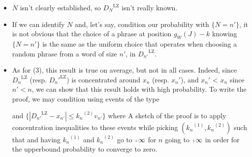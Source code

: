 \begin{itemize}
    \item $N$ isn't clearly established, so 
          ${D_N}^{\text{LZ}}$ isn't really known.

    \item If we can identify $N$ and, let's say,
          condition our probability with $\{ N = n' \}$, 
          it is not obvious
          that the choice of a phrase at position ${g_W(J)-k}$
          knowing $\{ N = n' \}$
          is the same as the uniform choice that operates
          when choosing a random phrase from a word of size
          $n'$, in ${D_{n'}}^{\text{LZ}}$.

    \item As for (3), this result is true on average, but 
          not in all cases. Indeed, since ${D_n}^{\text{LZ}}$
          (resp. ${D_n'}^{\text{LZ}}$) is concentrated
          around $x_n$ (resp. $x_n'$), and $x_n'$ < $x_n$
          since $n' < n$, we can show 
          that this result holds with high probability.
          To write the proof, we may condition using
          events of the type


          \leftcenters
            {and}
            {$\{ | {D_{n'}}^{\text{LZ}} - x_{n'} | \leq {k_n}^{(2)} v_{n'} \} $}
          where 
          \noindent
          A sketch of the proof is to
          apply concentration 
          inequalities to these events 
          while picking $({k_n}^{(1)}, {k_n}^{(2)})$ such that 
          \noindent
          and having ${k_n}^{(1)}$ and ${k_n}^{(2)}$ go to $\pinf$ for 
          $n$ going to $\pinf$ in order for the upperbound probability
          to converge to zero. 
\end{itemize}